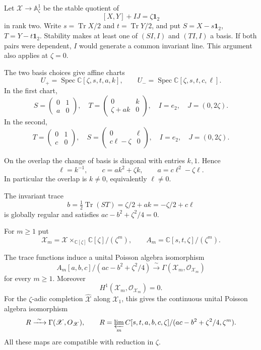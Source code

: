 Let $\mathscr X\to\mathbb A^1_\zeta$ be the stable quotient of
\[
 [X,Y]+IJ=\zeta\mathbf1_2
\]
in rank two. Write $s=\operatorname{Tr}X/2$ and
$t=\operatorname{Tr}Y/2$, and put $S=X-s\mathbf1_2$,
$T=Y-t\mathbf1_2$.
Stability makes at least one of $(SI,I)$ and $(TI,I)$ a basis.
If both pairs were dependent, $I$ would generate a common invariant line. This argument also applies
at $\zeta=0$.

The two basis choices give affine charts
\[
 U_+=\operatorname{Spec}\mathbb C[\zeta,s,t,a,k],\qquad
 U_-=\operatorname{Spec}\mathbb C[\zeta,s,t,c,\ell].
\]
In the first chart,
\[
 S=\begin{pmatrix}0&1\\a&0\end{pmatrix},\quad
 T=\begin{pmatrix}0&k\\\zeta+ak&0\end{pmatrix},\quad
 I=e_2,\quad J=(0,2\zeta).
\]
In the second,
\[
 T=\begin{pmatrix}0&1\\c&0\end{pmatrix},\quad
 S=\begin{pmatrix}0&\ell\\c\ell-\zeta&0\end{pmatrix},\quad
 I=e_2,\quad J=(0,2\zeta).
\]

On the overlap the change of basis is diagonal with entries
$k,1$. Hence
\begin{equation}\label{mht:frgl:eq:stable-family-gluing}
 \ell=k^{-1},\qquad c=ak^2+\zeta k,
 \qquad a=c\ell^2-\zeta\ell.
\end{equation}
In particular the overlap is $k\ne0$, equivalently $\ell\ne0$.

The invariant trace
\[
 b=\tfrac12\operatorname{Tr}(ST)
   =\zeta/2+ak=-\zeta/2+c\ell
\]
is globally regular and satisfies $ac-b^2+\zeta^2/4=0$.

For $m\ge1$ put
\[
 \mathscr X_m=\mathscr X\times_{\mathbb C[\zeta]}
                \mathbb C[\zeta]/(\zeta^m),
\qquad
 A_m=\mathbb C[s,t,\zeta]/(\zeta^m).
\]

\begin{theorem}
\label{mht:frgl:thm:geometric-formal-recipient}
The trace functions induce a unital Poisson algebra isomorphism
\[
 A_m[a,b,c]/(ac-b^2+\zeta^2/4)
    \xrightarrow{\ \sim\ }
 \Gamma(\mathscr X_m,\mathcal O_{\mathscr X_m})
\]
for every $m\ge1$. Moreover
\[
 H^1(\mathscr X_m,\mathcal O_{\mathscr X_m})=0.
\]
For the $\zeta$-adic completion $\widehat{\mathscr X}$ along
$\mathscr X_1$, this gives the continuous unital Poisson
algebra isomorphism
\[
 \widehat R
   \xrightarrow{\ \sim\ }
 \Gamma(\widehat{\mathscr X},\mathcal O_{\widehat{\mathscr X}}),
\qquad
 \widehat R=\varprojlim_m
  \mathbb C[s,t,a,b,c,\zeta]/
   (ac-b^2+\zeta^2/4,\zeta^m).
\]
All these maps are compatible with reduction in $\zeta$.
\end{theorem}

